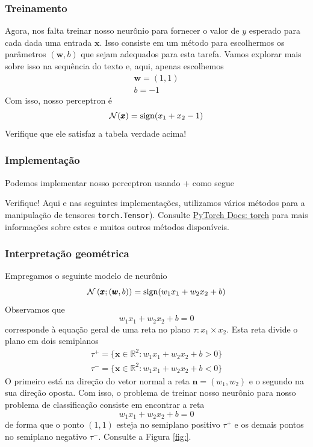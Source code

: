     
\subsubsection{Treinamento}

Agora, nos falta treinar nosso neurônio para fornecer o valor de $y$ esperado para cada dada uma entrada $\pmb{x}$. Isso consiste em um método para escolhermos os parâmetros $(\pmb{w},b)$ que sejam adequados para esta tarefa. Vamos explorar mais sobre isso na sequência do texto e, aqui, apenas escolhemos
\begin{gather}
  \pmb{w} = (1, 1)\\
  b = -1
\end{gather}
Com isso, nosso perceptron é
\begin{equation}
  \mathcal{N}(\pmb{x}) = \operatorname{sign}(x_1 + x_2 - 1)
\end{equation}
Verifique que ele satisfaz a tabela verdade acima!


\subsubsection{Implementação}

\ifispython
Podemos implementar nosso perceptron usando {\python}+{\pytorch} como segue



Verifique! Aqui e nas seguintes implementações, utilizamos vários métodos para a manipulação de tensores \lstinline+torch.Tensor+). Consulte \href{https://pytorch.org/docs/stable/torch.html}{PyTorch Docs: torch} para mais informações sobre estes e muitos outros métodos disponíveis.
\fi

\subsubsection{Interpretação geométrica}

Empregamos o seguinte modelo de neurônio
\begin{equation}
  \mathcal{N}\left(\pmb{x};(\pmb{w},b)\right) = \operatorname{sign}(w_1x_1 + w_2x_2 + b)
\end{equation}
Observamos que
\begin{equation}
  w_1x_1 + w_2x_2 + b = 0
\end{equation}
corresponde à equação geral de uma reta no plano $\tau: x_1\times x_2$. Esta reta divide o plano em dois semiplanos
\begin{align}
  \tau^+ = \{\pmb{x}\in\mathbb{R}^2: w_1x_1 + w_2x_2 + b > 0\}\\
  \tau^- = \{\pmb{x}\in\mathbb{R}^2: w_1x_1 + w_2x_2 + b < 0\}
\end{align}
O primeiro está na direção do vetor normal a reta $\pmb{n} = (w_1, w_2)$ e o segundo na sua direção oposta. Com isso, o problema de treinar nosso neurônio para nosso problema de classificação consiste em encontrar a reta
\begin{equation}
  w_1x_1 + w_2x_2 + b = 0
\end{equation}
de forma que o ponto $(1,1)$ esteja no semiplano positivo $\tau^+$ e os demais pontos no semiplano negativo $\tau^-$. Consulte a Figura \ref{fig:}.


